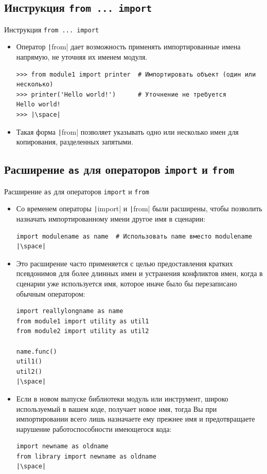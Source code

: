 \documentclass[aspectratio=169, mathserif]{beamer}	%
\begin{document}
\subsection{Инструкция \texttt{from ... import}}
\begin{frame}[fragile]{Инструкция \texttt{from ... import}}
\scriptsize
\begin{itemize}
	\item Оператор \texttt|from| дает возможность применять импортированные имена напрямую, не уточняя их именем модуля.
\vfill
\begin{verbatim}
>>> from module1 import printer  # Импортировать объект (один или несколько)
>>> printer('Hello world!')      # Уточнение не требуется
Hello world!
>>> |\space|
\end{verbatim}
\vfill
\item Такая форма  \texttt|from| позволяет указывать одно или несколько имен для копирования, разделенных запятыми.
\end{itemize}
\vfill
\end{frame}

\subsection{Расширение \texttt{as} для операторов \texttt{import} и \texttt{from}}
\begin{frame}[fragile]{Расширение \texttt{as} для операторов \texttt{import} и \texttt{from}}
\scriptsize
\begin{itemize}
	\item Со временем операторы \texttt|import| и \texttt|from| были расширены, чтобы позволить назначать импортированному имени другое имя в сценарии:
\vfill
\begin{verbatim}
import modulename as name  # Использовать name вместо modulename
|\space|
\end{verbatim}
\vfill
\item Это расширение часто применяется с целью предоставления кратких псевдонимов для более длинных имен и устранения конфликтов имен, когда в сценарии уже используется имя, которое иначе было бы перезаписано обычным оператором:
\vfill
\begin{verbatim}
import reallylongname as name
from module1 import utility as util1
from module2 import utility as util2

name.func()
util1()
util2()
|\space|
\end{verbatim}
\item Если в новом выпуске библиотеки модуль или инструмент, широко используемый в вашем коде, получает новое имя, тогда Вы при импортировании всего лишь назначаете ему прежнее имя и предотвращаете нарушение работоспособности имеющегося кода:
\vfill
\begin{verbatim}
import newname as oldname
from library import newname as oldname
|\space|
\end{verbatim}
\end{itemize}
\vfill
\end{frame}
\end{document}
